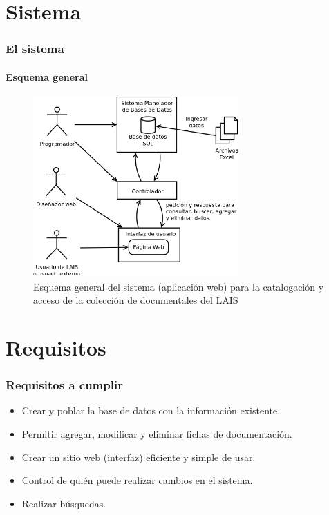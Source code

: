 \documentclass{beamer}
\begin{document}
\section{Sistema}
\begin{frame}
	\frametitle{El sistema}
	\framesubtitle{Esquema general}
	\begin{figure}[H]
		\centering
		\includegraphics[width=0.7\textwidth]{EsquemaGeneral.png}
		\caption{Esquema general del sistema (aplicación web) para la catalogación y acceso de la colección de documentales del LAIS}
		\label{fig:esquema_general}
	\end{figure}
\end{frame}

\section{Requisitos}
\begin{frame}
	\frametitle{Requisitos a cumplir}
	
	\begin{itemize}
		\item Crear y poblar la base de datos con la información existente.
		\item Permitir agregar, modificar y eliminar fichas de documentación.
		\item Crear un sitio web (interfaz) eficiente y simple de usar.
		\item Control de quién puede realizar cambios en el sistema.
		\item Realizar búsquedas.
	\end{itemize}
\end{frame}
\end{document}
